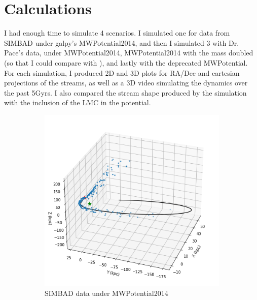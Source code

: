 \documentclass[12pt]{article}
\begin{document}
\section{Calculations}
I had enough time to simulate 4 scenarios. I simulated one for data from SIMBAD under galpy's MWPotential2014, and then I simulated 3 with Dr. Pace's data, under MWPotential2014, MWPotential2014 with the mass doubled (so that I could compare with \cite{Carlin_2018}), and lastly with the deprecated MWPotential. For each simulation, I produced 2D and 3D plots for RA/Dec and cartesian projections of the streams, as well as a 3D video simulating the dynamics over the past 5Gyrs. I also compared the stream shape produced by the simulation with the inclusion of the LMC in the potential.

\begin{figure}[H]
\begin{subfigure}{.45\textwidth}
  \centering
  \includegraphics[width=\linewidth]{MWPot2014_orbit_fn.png}
  \caption{SIMBAD data under MWPotential2014}
  \label{fig:1.1}
\end{subfigure}
\begin{subfigure}{.45\textwidth}
  \centering

\end{subfigure}
\end{figure}
\end{document}
